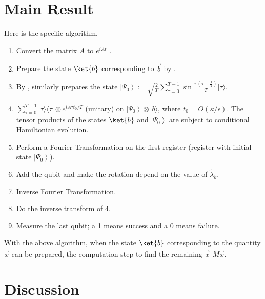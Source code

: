 \documentclass[b5paper,papersize,dvipdfmx,fleqn]{jsarticle}
\begin{document}
\section{Main Result}

Here is the specific algorithm.
\begin{enumerate}
  \item Convert the matrix $A$ to $e^{iAt}$ \cite{Berry2007}.
  \item Prepare the state $\ket{b}$ corresponding to $\vec{b}$ by \cite{Grover2002}.
  \item By \cite{Grover2002}, similarly prepares the state $\displaystyle \left|\Psi_{0}\right\rangle:=\sqrt{\frac{2}{T}}\sum_{\tau=0}^{T-1}\sin \frac{\pi\left(\tau+\frac{1}{2}\right)}{T}|\tau\rangle$.
  \item $\displaystyle \sum_{\tau=0}^{T-1}|\tau\rangle\langle\tau| \otimes e^{i A \tau t_{0} / T}$ (unitary) on $\left|\Psi_{0}\right\rangle \otimes|b\rangle$, where $t_{0}=O(\kappa / \epsilon)$. The tensor products of the states $\ket{b}$ and $\left|\Psi_{0}\right\rangle$ are subject to conditional Hamiltonian evolution.
\item  Perform a Fourier Transformation on the first register (register with initial state $\left|\Psi_{0}\right\rangle$).
  \item Add the qubit and make the rotation depend on the value of $\tilde{\lambda}_{k}$.
  \item Inverse Fourier Transformation.
  \item Do the inverse transform of 4.
  \item Measure the last qubit; a 1 means success and a 0 means failure.
\end{enumerate}
With the above algorithm, when the state $\ket{b}$ corresponding to the quantity $\vec{x}$ can be prepared, the computation step to find the remaining $\vec{x}^\dagger M\vec{x}$.



\section{Discussion}
\end{document}
